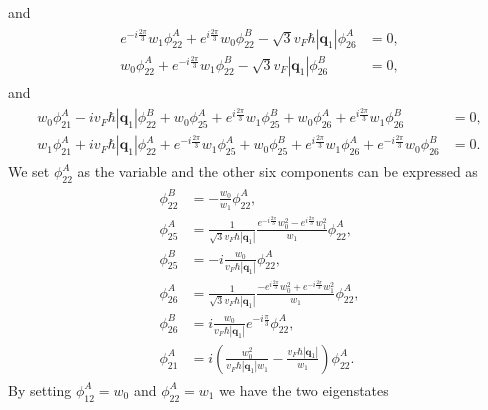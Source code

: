 \documentclass[10pt, oneside]{article}
\newcommand{\p}[1]{\left(#1\right)}
\newcommand{\bv}[1]{\left|#1\right|}
\begin{document}
and 
\begin{align}
	\begin{split}
		e^{-i \frac{2 \pi}{3}} w_1 \phi_{22}^{A} + e^{i \frac{2 \pi}{3}} w_0 \phi_{22}^B - \sqrt{3} v_F \hbar \bv{\bm{q}_1} \phi_{26}^{A} & = 0, \\
		w_0 \phi_{22}^{A} + e^{-i \frac{2 \pi}{3}} w_1 \phi_{22}^{B} -  \sqrt{3} v_F \bv{\bm{q}_1} \phi_{26}^{B} & = 0,
	\end{split}
\end{align}
and 
\begin{align}
	\begin{split}
		w_0 \phi_{21}^{A}  - i v_F \hbar \bv{\bm{q}_1} \phi_{22}^{B} + w_0 \phi_{25}^{A} + e^{i \frac{2 \pi}{3}} w_1 \phi_{25}^{B} + w_0 \phi_{26}^{A} + e^{ i \frac{2 \pi}{3}} w_1 \phi_{26}^{B} & = 0, \\
		w_1 \phi_{21}^{A} + i v_F \hbar \bv{\bm{q}_1} \phi_{22}^{A} + e^{ -i \frac{2 \pi}{3}} w_1 \phi_{25}^{A} + w_0 \phi_{25}^{B} + e^{ i \frac{2 \pi}{3}} w_1 \phi_{26}^{A} +  e^{ -i \frac{2 \pi}{3}} w_0 \phi_{26}^{B} & = 0.
	\end{split}
\end{align}
We set \(\phi_{22}^{A}\) as the variable and the other six components can be expressed as
\begin{align}
	\begin{split}
		\phi_{22}^{B} & = - \frac{w_0}{w_1} \phi_{22}^{A}, \\
		\phi_{25}^{A} & = \frac{1}{\sqrt{3} v_F \hbar \bv{\bm{q}_1}} \frac{e^{ -i\frac{2 \pi}{3}} w_{0}^{2} - e^{ i \frac{2 \pi}{3}} w_{1}^{2}}{w_1} \phi_{22}^{A}, \\
		\phi_{25}^{B} & = - i \frac{w_0}{v_F \hbar \bv{\bm{q}_1}} \phi_{22}^{A}, \\
		\phi_{26}^{A} & = \frac{1}{\sqrt{3} v_F \hbar \bv{\bm{q}_1}} \frac{ - e^{i \frac{2 \pi}{3}} w_{0}^{2} + e^{- i \frac{2 \pi}{3}} w_{1}^{2}}{w_1} \phi_{22}^{A}, \\
		\phi_{26}^{B} & = i \frac{w_0}{ v_F \hbar \bv{\bm{q}_1}} e^{-i \frac{\pi}{3}} \phi_{22}^{A}, \\
		\phi_{21}^{A} & = i \p{\frac{w_{0}^{2}}{ v_F \hbar \bv{\bm{q}_1} w_1} - \frac{ v_F \hbar \bv{\bm{q}_1}}{w_1}} \phi_{22}^{A}.
	\end{split}
\end{align}
By setting \(\phi_{12}^{A} = w_0\) and \(\phi_{22}^{A} = w_1\) we have the two eigenstates
\end{document}

